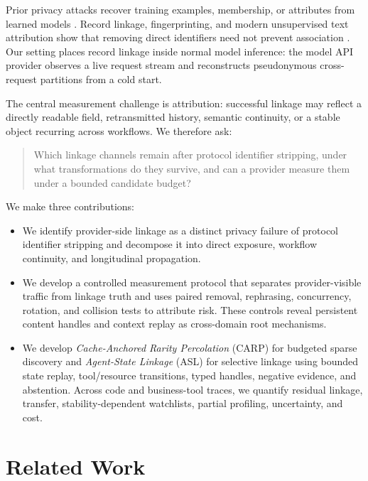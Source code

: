 \documentclass[letterpaper]{article} %
\begin{document}
Prior privacy attacks recover training examples, membership, or attributes from learned models
\cite{shokri2017membership,carlini2021extracting}. Record linkage, fingerprinting, and modern
unsupervised text attribution show that removing direct identifiers need not prevent association
\cite{fellegi1969theory,sweeney2002kanonymity,narayanan2009anonymizing,eckersley2010unique,bertocco2023unsupervised}.
Our setting places record linkage inside normal model inference: the model API provider observes a
live request stream and reconstructs pseudonymous cross-request partitions from a cold start.

The central measurement challenge is attribution: successful linkage may reflect a directly readable
field, retransmitted history, semantic continuity, or a stable object recurring across workflows. We
therefore ask:

\begin{quote}
Which linkage channels remain after protocol identifier stripping, under what transformations do
they survive, and can a provider measure them under a bounded candidate budget?
\end{quote}

We make three contributions:
\begin{itemize}
    \item We identify provider-side linkage as a distinct privacy failure of protocol identifier
    stripping and decompose it into direct exposure, workflow continuity, and longitudinal propagation.
    \item We develop a controlled measurement protocol that separates provider-visible traffic from
    linkage truth and uses paired removal, rephrasing, concurrency, rotation, and collision tests to
    attribute risk. These controls reveal persistent content handles and context replay as cross-domain
    root mechanisms.
    \item We develop \emph{Cache-Anchored Rarity Percolation} (\textsc{CARP}) for budgeted sparse
    discovery and \emph{Agent-State Linkage} (\textsc{ASL}) for selective linkage using bounded state
    replay, tool/resource transitions, typed handles, negative evidence, and abstention. Across code
    and business-tool traces, we quantify residual linkage, transfer, stability-dependent watchlists,
    partial profiling, uncertainty, and cost.
\end{itemize}

\section{Related Work}
\end{document}
